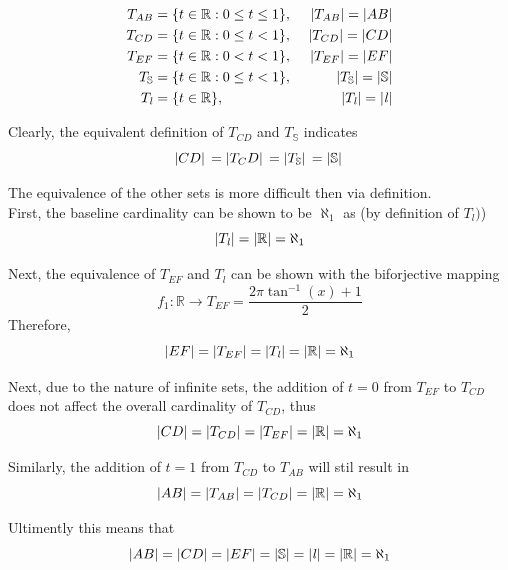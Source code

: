 \documentclass[]{article}
\newcommand{\R}{\mathbb{R}}
\begin{document}
\begin{align*}
	T_{AB} &= \{t \in \R : 0 \leq t \leq 1\}, \ &\abs{T_{AB}} = \abs{AB}\\
	T_{CD} &= \{t \in \R : 0 \leq t < 1\}, \ &\abs{T_{CD}} = \abs{CD}\\
	T_{EF} &= \{t \in \R : 0 < t < 1\}, \ &\abs{T_{EF}} = \abs{EF}\\
	T_{\mathbb{S}} &= \{t \in \R : 0 \leq t < 1\}, \ &\abs{T_{\mathbb{S}}} = \abs{\mathbb{S}}\\
	T_{\mathit{l}} &= \{t \in \R\}, \ &\abs{T_{\mathit{l}}} = \abs{\mathit{l}}\\
\end{align*}

Clearly, the equivalent definition of $T_{CD}$ and $T_{\mathbb{S}}$ indicates
$$\abs*{CD} = \abs*{T_CD} = \abs*{T_\mathbb{S}} = \abs*{\mathbb{S}}$$

The equivalence of the other sets is more difficult then via definition.\\
First, the baseline cardinality can be shown to be $\aleph_1$ as (by definition of $T_{\mathit{l}})$)
$$\abs{T_\mathit{l}} = \abs{\R} = \aleph_1$$

Next, the equivalence of $T_{EF}$ and $T_\mathit{l}$ can be shown with the biforjective mapping 
$$f_1 : \R \rightarrow T_{EF} = \frac{2 \pi \tan^{-1}(x) + 1}{2}$$
Therefore,
$$\abs{EF} = \abs{T_{EF}} = \abs{T_{\mathit{l}}} = \abs{\R} = \aleph_1$$

Next, due to the nature of infinite sets, the addition of $t=0$ from $T_{EF}$ to $T_{CD}$ 
does not affect the overall cardinality of $T_{CD}$, thus
$$\abs{CD} = \abs{T_{CD}} = \abs{T_{EF}} = \abs{\R} = \aleph_1$$

Similarly, the addition of $t=1$ from $T_{CD}$ to $T_{AB}$ will stil result in 
$$\abs{AB} = \abs{T_{AB}} = \abs{T_{CD}} = \abs{\R} = \aleph_1$$

Ultimently this means that
$$\abs{AB} = \abs{CD} = \abs{EF} = \abs{\mathbb{S}} = \abs{\mathit{l}} = \abs{\R} = \aleph_1$$
\end{document}
